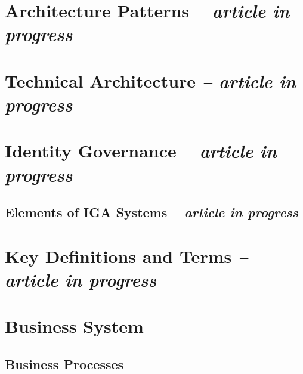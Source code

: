 \hypertarget{architecture-patterns-article-in-progress}{%
\section{\texorpdfstring{Architecture Patterns \emph{-- article in
progress}}{Architecture Patterns -- article in progress}}\label{architecture-patterns-article-in-progress}}

\hypertarget{technical-architecture-article-in-progress}{%
\section{\texorpdfstring{Technical Architecture \emph{-- article in
progress}}{Technical Architecture -- article in progress}}\label{technical-architecture-article-in-progress}}

\hypertarget{identity-governance-article-in-progress}{%
\section{\texorpdfstring{Identity Governance \emph{-- article in
progress}}{Identity Governance -- article in progress}}\label{identity-governance-article-in-progress}}

\hypertarget{elements-of-iga-systems-article-in-progress}{%
\subsection{\texorpdfstring{Elements of IGA Systems \emph{-- article
in
progress}}{Elements of IGA Systems -- article in progress}}\label{elements-of-iga-systems-article-in-progress}}

\hypertarget{key-definitions-and-terms-article-in-progress}{%
\section{\texorpdfstring{Key Definitions and Terms \emph{-- article
in
progress}}{Key Definitions and Terms -- article in progress}}\label{key-definitions-and-terms-article-in-progress}}

\hypertarget{business-system}{%
\section{Business System}\label{business-system}}

\hypertarget{business-processes}{%
\subsection{Business Processes}\label{business-processes}}

